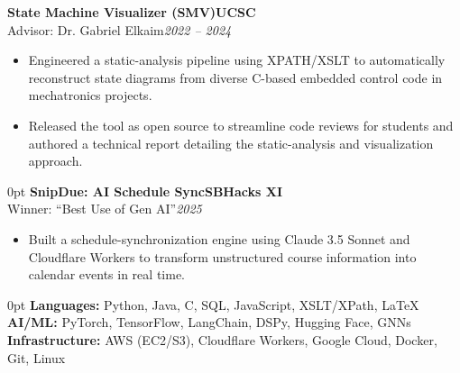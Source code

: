 \documentclass[11pt]{article}
\newlength{\sectionwidth}
\newcommand{\CVSection}[2]{%
  \vspace{1.4em} 
  \noindent
  \makebox[0pt][l]{%
    \parbox[t]{\sectionwidth}{%
      \raggedright\scshape\bfseries\small #1%
    }%
  }%
  \begin{adjustwidth}{\sectionwidth}{0pt}
    #2
  \end{adjustwidth}
}
\newcommand{\CVEntry}[4]{%
  \vspace{0.4em} %
  {\bfseries #1}\hfill {\bfseries #2}\\[0.1em] 
  #3\hfill \textit{#4}
}
\begin{document}
{\begin{itemize}
  \end{itemize}
  \newpage
  \noindent\CVEntry
    {State Machine Visualizer (SMV)}
    {UCSC}
    {Advisor: Dr. Gabriel Elkaim}
    {2022 -- 2024}
  \begin{itemize}
    \item Engineered a static-analysis pipeline using XPATH/XSLT to automatically reconstruct state diagrams from diverse C-based embedded control code in mechatronics projects.
    \item Released the tool as open source to streamline code reviews for students and authored a technical report detailing the static-analysis and visualization approach.
  \end{itemize}
}

\CVSection{Awards \&\\Projects}{%
  \CVEntry
    {SnipDue: AI Schedule Sync}
    {SBHacks XI}
    {Winner: ``Best Use of Gen AI''}
    {2025}
  \begin{itemize}
    \item Built a schedule-synchronization engine using Claude 3.5 Sonnet and Cloudflare Workers to transform unstructured course information into calendar events in real time.
  \end{itemize}
}

\CVSection{Technical\\Skills}{%
  \textbf{Languages:} Python, Java, C, SQL, JavaScript, XSLT/XPath, LaTeX\\
  \textbf{AI/ML:} PyTorch, TensorFlow, LangChain, DSPy, Hugging Face, GNNs\\
  \textbf{Infrastructure:} AWS (EC2/S3), Cloudflare Workers, Google Cloud, Docker, Git, Linux
}
\end{document}
